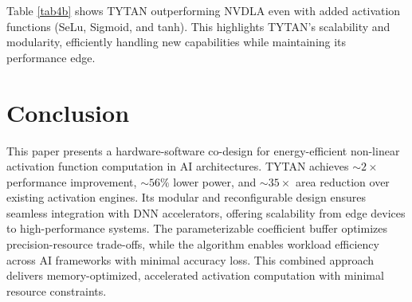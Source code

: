 \documentclass[conference,10pt]{IEEEtran}
\begin{document}
    Table \ref{tab4b} shows TYTAN outperforming NVDLA even with added activation functions (SeLu, Sigmoid, and tanh). This highlights TYTAN's scalability and modularity, efficiently handling new capabilities while maintaining its performance edge.

\section{Conclusion}
    This paper presents a hardware-software co-design for energy-efficient non-linear activation function computation in AI architectures. TYTAN achieves $\sim2\times$ performance improvement, $\sim56\%$ lower power, and $\sim35\times$ area reduction over existing activation engines. Its modular and reconfigurable design ensures seamless integration with DNN accelerators, offering scalability from edge devices to high-performance systems. The parameterizable coefficient buffer optimizes precision-resource trade-offs, while the algorithm enables workload efficiency across AI frameworks with minimal accuracy loss. This combined approach delivers memory-optimized, accelerated activation computation with minimal resource constraints.


{
    
}
\end{document}
